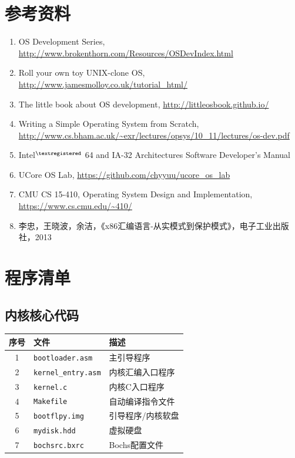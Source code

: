 \documentclass[logo,reportComp]{thesis}
\begin{document}
\section{参考资料}
\begin{enumerate}
	\item OS Development Series, \url{http://www.brokenthorn.com/Resources/OSDevIndex.html}
	\item Roll your own toy UNIX-clone OS, \url{http://www.jamesmolloy.co.uk/tutorial_html/}
	\item The little book about OS development, \url{http://littleosbook.github.io/}
	\item Writing a Simple Operating System from Scratch, \url{http://www.cs.bham.ac.uk/~exr/lectures/opsys/10_11/lectures/os-dev.pdf}
	\item Intel$^{\textregistered}$ 64 and IA-32 Architectures Software Developer's Manual
	\item UCore OS Lab, \url{https://github.com/chyyuu/ucore_os_lab}
	\item CMU CS 15-410, Operating System Design and Implementation, \url{https://www.cs.cmu.edu/~410/}
	\item 李忠，王晓波，余洁，《x86汇编语言-从实模式到保护模式》，电子工业出版社，2013
\end{enumerate}

\appendix
\appendixconfig
\section{程序清单}
\subsection{内核核心代码}
\begin{center}
\begin{tabular}{|c|l|l|}\hline
\textbf{序号} & \textbf{文件} & \textbf{描述} \\\hline
1 & \verb'bootloader.asm' & 主引导程序\\\hline
2 & \verb'kernel_entry.asm' & 内核汇编入口程序\\\hline
3 & \verb'kernel.c' & 内核C入口程序\\\hline
4 & \verb'Makefile' & 自动编译指令文件\\\hline
5 & \verb'bootflpy.img' & 引导程序/内核软盘\\\hline
6 & \verb'mydisk.hdd' & 虚拟硬盘\\\hline
7 & \verb'bochsrc.bxrc' & Bochs配置文件\\\hline
\end{tabular}
\end{center}
\end{document}
